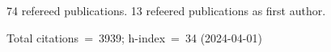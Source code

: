 74 refereed publications. 13 refeered publications as first author.

Total citations~=~3939; h-index~=~34 (2024-04-01)